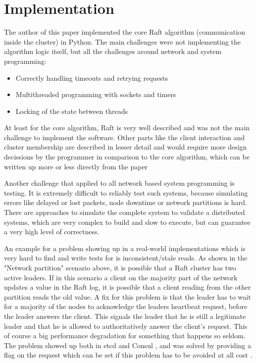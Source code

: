 \section{Implementation}

The author of this paper implemented the core Raft algorithm (communication inside the cluster) in Python. The main challenges were not implementing the algorithm logic itself, but all the challenges around network and system programming:
\begin{itemize}
    \item Correctly handling timeouts and retrying requests
    \item Multithreaded programming with sockets and timers
    \item Locking of the state between threads
\end{itemize}

At least for the core algorithm, Raft is very well described and was not the main challenge to implement the software.
Other parts like the client interaction and cluster membership are described in lesser detail and would require more design decissions by the programmer
in comparison to the core algorithm, which can be written up more or less directly from the paper

Another challenge that applied to all network based system programming is testing. It is extremely difficult to reliably test such systems, because simulating errors like
delayed or lost packets, node downtime or network partitions is hard. There are approaches to simulate the complete system to validate a distributed systems,
which are very complex to build and slow to execute, but can guarantee a very high level of correctness\cite{foundationdb_testing}.

An example for a problem showing up in a real-world implementations which is very hard to find and write tests for is inconsistent/stale reads. As shown in the "Network partition" scenario above, it is possible that a Raft cluster has two active leaders. If in this scenario a client on the majority part of the network updates a value in the Raft log, it is possible that a client reading from the other partition reads the old value. A fix for this problem is that the leader has to wait for a majority of the nodes to acknowledge the leaders heartbeat request, before the leader answers the client. This signals the leader that he is still a legitimate leader and that he is allowed to authoritatively answer the client's request.  This of course a big performance degradation for something that happens so seldom. The problem showed up both in etcd and Consul \cite{aphyr_call_me_maybe}, and was solved by providing a flag on the request which can be set if this problem has to be avoided at all cost \cite{etcd_consistency} \cite{consul_consistency}.


